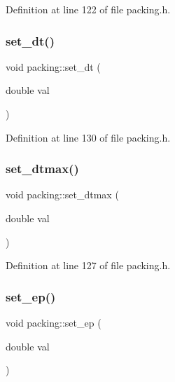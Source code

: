 Definition at line 122 of file packing.\+h.

\mbox{\label{classpacking_a2d86b4b1188bd7d3c9b13dacbb0ca2fb}} 
\subsubsection{\texorpdfstring{set\+\_\+dt()}{set\_dt()}}
{\footnotesize\ttfamily void packing\+::set\+\_\+dt (\begin{DoxyParamCaption}\item[{double}]{val }\end{DoxyParamCaption})\hspace{0.3cm}{\ttfamily [inline]}}



Definition at line 130 of file packing.\+h.

\mbox{\label{classpacking_a5dc1a61832b80ca41be310784cec6008}} 
\subsubsection{\texorpdfstring{set\+\_\+dtmax()}{set\_dtmax()}}
{\footnotesize\ttfamily void packing\+::set\+\_\+dtmax (\begin{DoxyParamCaption}\item[{double}]{val }\end{DoxyParamCaption})\hspace{0.3cm}{\ttfamily [inline]}}



Definition at line 127 of file packing.\+h.

\mbox{\label{classpacking_a3371ec250e3165eae9231914a7e7fa88}} 
\subsubsection{\texorpdfstring{set\+\_\+ep()}{set\_ep()}}
{\footnotesize\ttfamily void packing\+::set\+\_\+ep (\begin{DoxyParamCaption}\item[{double}]{val }\end{DoxyParamCaption})\hspace{0.3cm}{\ttfamily [inline]}}




